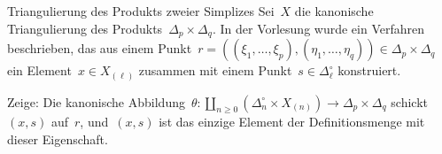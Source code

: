 \documentclass{uebblatt}
\begin{document}

\enlargethispage{1em}

\begin{aufgabe}{Triangulierung des Produkts zweier Simplizes}
Sei~$X$ die kanonische Triangulierung des Produkts~$\Delta_p \times \Delta_q$.
In der Vorlesung wurde ein Verfahren beschrieben, das aus einem
Punkt~$r = ((\xi_1,\ldots,\xi_p), (\eta_1,\ldots,\eta_q)) \in \Delta_p \times
\Delta_q$ ein Element~$x \in X_{(\ell)}$ zusammen mit einem Punkt~$s \in
\Delta_\ell^\circ$ konstruiert.

Zeige: Die kanonische Abbildung~$\theta : \coprod_{n \geq 0} (\Delta_n^\circ \times
X_{(n)}) \to \Delta_p \times \Delta_q$ schickt~$(x,s)$ auf~$r$, und~$(x,s)$ ist
das einzige Element der Definitionsmenge mit dieser Eigenschaft.
\end{aufgabe}
\end{document}
